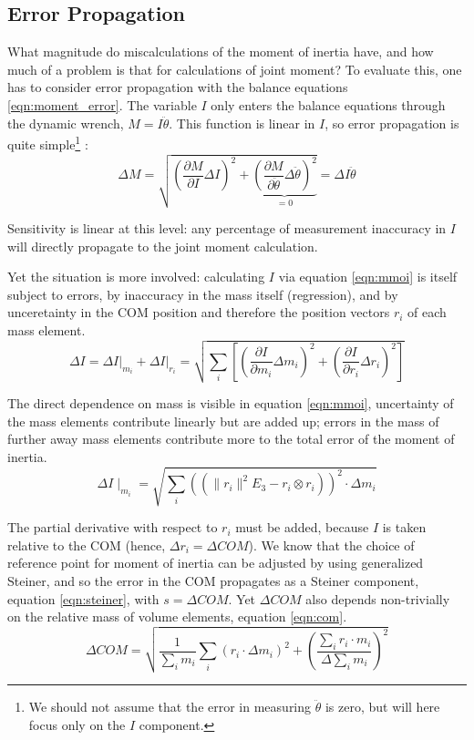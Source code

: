 \subsection{Error Propagation}
\label{sec:org1bbebb9}
What magnitude do miscalculations of the moment of inertia have, and how much of a problem is that for calculations of joint moment?
To evaluate this, one has to consider error propagation \citep{Hughes2010,Arroyave2022,Myers2015} with the balance equations \eqref{eqn:moment_error}.
The variable \(I\) only enters the balance equations through the dynamic wrench, \(M = I \ddot\theta\).
This function is linear in \(I\), so error propagation is quite simple\footnote{We should not assume that the error in measuring \(\ddot \theta\) is zero, but will here focus only on the \(I\) component.} \citep{Normann2016}:
\begin{equation}\label{eqn:moment_error}
\Delta M = \sqrt{\left(\frac{\partial M}{\partial I}\Delta I\right)^2 + \underbrace{\left(\frac{\partial M}{\partial \ddot \theta}\Delta \ddot \theta\right)^2}_{=0} } = \Delta I \ddot\theta
\end{equation}


Sensitivity is linear at this level: any percentage of measurement inaccuracy in \(I\) will directly propagate to the joint moment calculation.


Yet the situation is more involved: calculating \(I\) via equation \eqref{eqn:mmoi} is itself subject to errors, by inaccuracy in the mass itself (regression), and by unceretainty in the COM position and therefore the position vectors \(r_{i}\) of each mass element.
\[ \Delta I = \left. \Delta I \right|_{m_i} + \left. \Delta I \right|_{r_i} = \sqrt{ \sum_{i} \left[ \left(\frac{\partial I}{\partial m_{i}} \Delta m_{i} \right)^2 + \left(\frac{\partial I}{\partial r_{i}} \Delta r_{i}\right)^2 \right] }\]


The direct dependence on mass is visible in equation \eqref{eqn:mmoi}, uncertainty of the mass elements contribute linearly but are added up; errors in the mass of further away mass elements contribute more to the total error of the moment of inertia.
\[ \Delta I \mid_{m_i} = \sqrt{\sum\limits_{i}\left(\left( \lVert r_{i} \rVert ^2 E_3 - r_{i} \otimes r_{i} \right)\right)^2 \cdot \Delta m_{i} }\]


The partial derivative with respect to \(r_{i}\) must be added, because \(I\) is taken relative to the COM (hence, \(\Delta r_i = \Delta COM\)).
We know that the choice of reference point for moment of inertia can be adjusted by using generalized Steiner, and so the error in the COM propagates as a Steiner component, equation \eqref{eqn:steiner}, with \(s=\Delta COM\).
Yet \(\Delta COM\) also depends non-trivially on the relative mass of volume elements, equation \eqref{eqn:com}.
\[ \Delta COM = \sqrt{ \frac{1}{\sum_i m_{i}} \sum\limits_{i} \left( r_{i} \cdot \Delta m_{i} \right)^2  + \left( \frac{ \sum\limits_{i} r_{i} \cdot m_{i} }{\Delta \sum_i m_{i} }\right)^{2}}\]


